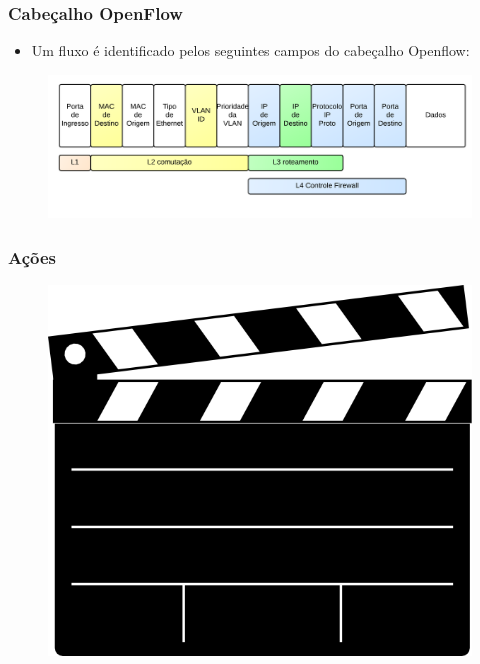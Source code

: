%
%
\begin{frame}\frametitle{Cabeçalho OpenFlow}

    \begin{itemize}
    \item Um fluxo é identificado pelos seguintes campos do cabeçalho 
          Openflow:
    \end{itemize}
	\begin{figure}[h]\hspace*{-1.2cm}
        \centering
        \includegraphics[width=\linewidth]{images/openflow-header}
    \end{figure}
\end{frame}



%
%
\begin{frame}\frametitle{Ações}

	\begin{figure}[h]
        \centering
        \includegraphics[scale=0.5]{images/action.png}
    \end{figure}
    
\end{frame}


